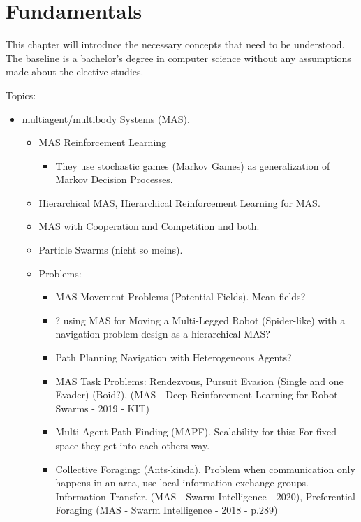 
\chapter{Fundamentals}

This chapter will introduce the necessary concepts that need to be understood. The baseline is a bachelor's degree in computer science without any assumptions made about the elective studies.

Topics:
\begin{itemize}[noitemsep,nolistsep]
	\item multiagent/multibody Systems (MAS).
	\begin{itemize}[noitemsep,nolistsep]
		\item MAS Reinforcement Learning
		\begin{itemize}[noitemsep,nolistsep]
			\item They use stochastic games (Markov Games) as generalization of Markov Decision Processes.
		\end{itemize}
		\item Hierarchical MAS, Hierarchical Reinforcement Learning for MAS.
		\item MAS with Cooperation and Competition and both.
		\item Particle Swarms (nicht so meins).
		\item Problems:
		\begin{itemize}[noitemsep,nolistsep]
			\item MAS Movement Problems (Potential Fields). Mean fields?
			\item ? using MAS for Moving a Multi-Legged Robot (Spider-like) with a navigation problem design as a hierarchical MAS?
			\item Path Planning Navigation with Heterogeneous Agents? 
			\item MAS Task Problems: Rendezvous, Pursuit Evasion (Single and one Evader) (Boid?), (MAS - Deep Reinforcement Learning for Robot Swarms - 2019 - KIT)
			\item Multi-Agent Path Finding (MAPF). Scalability for this: For fixed space they get into each others way.
			\item Collective Foraging: (Ants-kinda). Problem when communication only happens in an area, use local information exchange groups. Information Transfer. (MAS - Swarm Intelligence - 2020), Preferential Foraging (MAS - Swarm Intelligence - 2018 - p.289)

\end{itemize}
\end{itemize}
\end{itemize}
